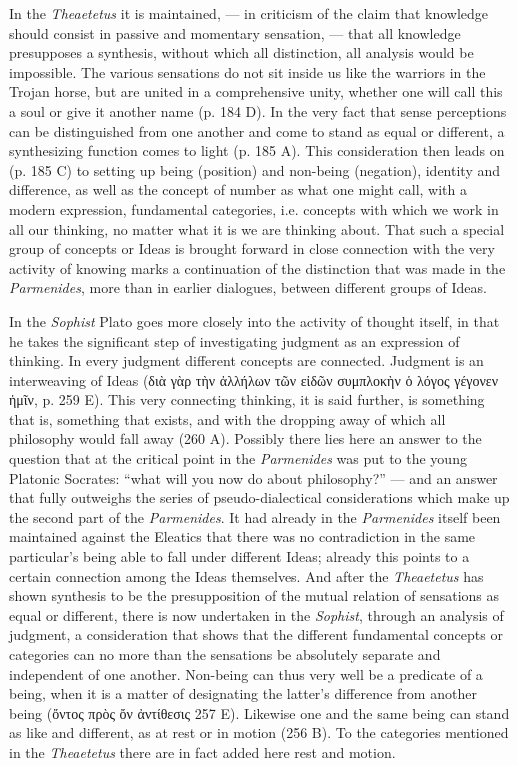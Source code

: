 \documentclass[12pt,a4paper,openany]{book}
\newcommand{\opage}[1]{\marginnote{\footnotesize\textit{[#1]}}}
\begin{document}
In the \textit{Theaetetus} it is maintained, --- in criticism of the claim that
knowledge should consist in passive and momentary sensation,
--- that all knowledge presupposes a synthesis, without which
all distinction, all analysis would be impossible.  The various
sensations do not sit inside us like the warriors in the Trojan
horse, but are united in a comprehensive unity,
whether one will call this a soul or give it
another name (p. 184 D).  In the very fact that
sense perceptions can be distinguished from one another and come
to stand as equal or different, a
synthesizing function comes to light (p. 185 A).  This consideration
then leads on (p. 185 C) to setting up being
(position) and non-being (negation), identity and difference,
as well as the concept of number as what one might call, with a modern expression,
fundamental categories, i.e. concepts with which we
work in all our thinking, no matter what it is
we are thinking about.  That such a special group
of concepts or Ideas is brought forward in close connection with the very
activity of knowing marks a continuation of the
\setcounter{footnote}{0}%
\opage{56}distinction that was made in the \textit{Parmenides}, more than in earlier dialogues,
between different groups of Ideas.

In the \textit{Sophist} Plato goes more closely into the activity of thought itself,
in that he takes the significant step of
investigating judgment as an expression of thinking.  In every
judgment different concepts are connected.  Judgment is an interweaving
of Ideas (διὰ γὰρ τὴν ἀλλήλων τῶν εἰδῶν συμπλοκὴν
ὁ λόγος γέγονεν ἡμῖν, p. 259 E).  This very connecting
thinking, it is said further, is something that is, something that exists,
and with the dropping away of which all philosophy would fall away
(260 A).  Possibly there lies here an answer to the question
that at the critical point in the \textit{Parmenides} was put to
the young Platonic Socrates: ``what will you now do about
philosophy?'' --- and an answer that fully outweighs the
series of pseudo-dialectical considerations which make up the second
part of the \textit{Parmenides}.  It had already in the \textit{Parmenides} itself
been maintained against the Eleatics that there was no
contradiction in the same particular's being able to fall under different
Ideas; already this points to a certain connection
among the Ideas themselves.  And after the \textit{Theaetetus} has
shown synthesis to be the presupposition of the mutual
relation of sensations as equal or different, there is now
undertaken in the \textit{Sophist}, through an analysis of judgment, a consideration
that shows that the different fundamental concepts or categories
can no more than the sensations be absolutely separate
and independent of one another.  Non-being can thus very well
be a predicate of a being, when it is a matter of designating
the latter's difference from another being (ὄντος πρὸς ὄν ἀντίθεσις
257 E).  Likewise one and the same being can stand as like
and different, as at rest or in motion (256 B).  To the categories
mentioned in the \textit{Theaetetus} there are in fact added here rest and
motion.
\end{document}
